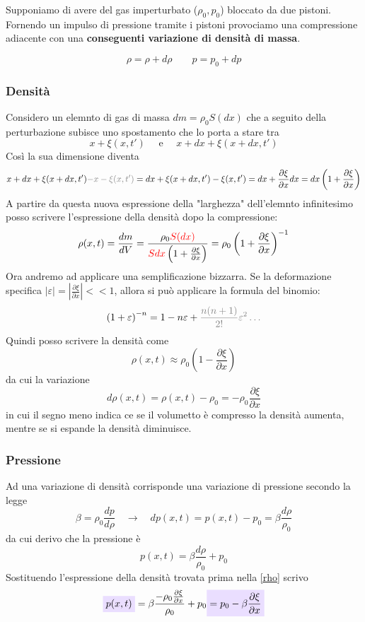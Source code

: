 \documentclass[x11names]{article}
\newcommand{\viola}[1]{\colorbox{myred}{$\displaystyle #1$}}
\begin{document}
	\noindent
	Supponiamo di avere del gas imperturbato (\(\rho_0, p_0\)) bloccato da due pistoni. Fornendo un impulso di pressione tramite i pistoni provociamo una compressione adiacente con una \textbf{conseguenti variazione di densità di massa}.
	
	\[
	\rho = \rho + d\rho \qquad p = p_0 + dp
	\]
	
	\subsubsection{Densità}
	Considero un elemnto di gas di massa \(dm = \rho_0S(dx)\) che a seguito della perturbazione subisce uno spostamento che lo porta a stare tra
	\[
	x + \xi(x,t') \quad \text{ e } \quad x + dx + \xi(x + dx,t')
	\]
	Così la sua dimensione diventa
	\[
	x + dx + \xi(x + dx,t') \textcolor{gray}{-x - \xi(x,t')} = dx + \xi(x + dx,t')- \xi(x,t') = dx + \frac{\partial \xi}{\partial x}dx = dx\left(1 + \frac{\partial \xi}{\partial x}\right)
	\]
	A partire da questa nuova espressione della "larghezza" dell'elemnto infinitesimo posso scrivere l'espressione della densità dopo la compressione:
	\[
	\rho(x,t) = \frac{dm}{dV} = \frac{\rho_0 \textcolor{red}{S (dx)}}{\textcolor{red}{Sdx}\left(1 + \frac{\partial \xi}{\partial x}\right)} = \rho_0\left(1 + \frac{\partial \xi}{\partial x}\right)^{-1}
	\]
	Ora andremo ad applicare una semplificazione bizzarra. Se la deformazione specifica $|\varepsilon| = \left|\frac{\partial \xi}{\partial x}\right|<< 1$, allora si può applicare la formula del binomio:
	\[
	\left(1 + \varepsilon\right)^{-n} = 1 - n\varepsilon + \textcolor{gray}{\frac{n(n+1)}{2!}\varepsilon^2\dots}
	\]
	Quindi posso scrivere la densità come
	\[
	\rho(x,t) \approx \rho_0\left(1 - \frac{\partial \xi}{\partial x}\right)
	\]
	da cui la variazione
	\begin{equation} \label{rho}
	d\rho(x,t) = \rho(x,t) - \rho_0 = - \rho_0\frac{\partial \xi}{\partial x}
	\end{equation}
	in cui il segno meno indica ce se il volumetto è compresso la densità aumenta, mentre se si espande la densità diminuisce.
	
	\subsubsection{Pressione}
	Ad una variazione di densità corrisponde una variazione di pressione secondo la legge
	\[
	\beta = \rho_0\frac{dp}{d\rho} \quad \to \quad dp(x,t) = p(x,t) - p_0 = \beta\frac{d\rho}{\rho_0}
	\]
	da cui derivo che la pressione è 
	\[
	p(x,t) = \beta\frac{d\rho}{\rho_0} +  p_0 
	\]
	Sostituendo l'espressione della densità trovata prima nella \ref{rho} scrivo
	\begin{equation}\label{1press}
	\viola{p(x,t)} = \beta\frac{- \rho_0\frac{\partial \xi}{\partial x}}{\rho_0} +  p_0 \viola{=p_0 - \beta\frac{\partial \xi}{\partial x}}
	\end{equation}
\end{document}
